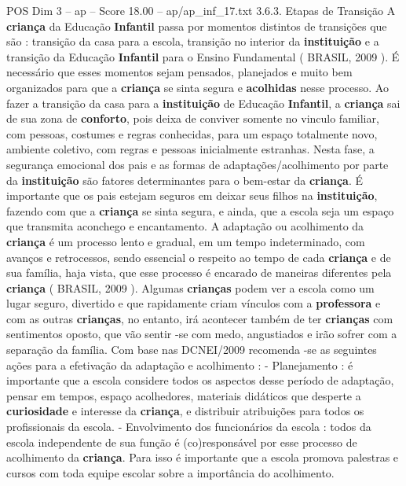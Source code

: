 \begin{textsample}{POS Dim 3 – ap – Score 18.00 – ap/ap\_inf\_17.txt}  \label{ex:f3_pos_186}
3.6.3.
Etapas de Transição A \textbf{criança} da Educação \textbf{Infantil} passa por momentos distintos de transições que são : transição da casa para a escola, transição no interior da \textbf{instituição} e a transição da Educação \textbf{Infantil} para o Ensino Fundamental ( BRASIL, 2009 ).
É necessário que esses momentos sejam pensados, planejados e muito bem organizados para que a \textbf{criança} se sinta segura e \textbf{acolhidas} nesse processo.
Ao fazer a transição da casa para a \textbf{instituição} de Educação \textbf{Infantil}, a \textbf{criança} sai de sua zona de \textbf{conforto}, pois deixa de conviver somente no vinculo familiar, com pessoas, costumes e regras conhecidas, para um espaço totalmente novo, ambiente coletivo, com regras e pessoas inicialmente estranhas.
Nesta fase, a segurança emocional dos pais e as formas de adaptações/acolhimento por parte da \textbf{instituição} são fatores determinantes para o bem-estar da \textbf{criança}.
É importante que os pais estejam seguros em deixar seus filhos na \textbf{instituição}, fazendo com que a \textbf{criança} se sinta segura, e ainda, que a escola seja um espaço que transmita aconchego e encantamento.
A adaptação ou acolhimento da \textbf{criança} é um processo lento e gradual, em um tempo indeterminado, com avanços e retrocessos, sendo essencial o respeito ao tempo de cada \textbf{criança} e de sua família, haja vista, que esse processo é encarado de maneiras diferentes pela \textbf{criança} ( BRASIL, 2009 ).
Algumas \textbf{crianças} podem ver a escola como um lugar seguro, divertido e que rapidamente criam vínculos com a \textbf{professora} e com as outras \textbf{crianças}, no entanto, irá acontecer também de ter \textbf{crianças} com sentimentos oposto, que vão sentir -se com medo, angustiados e irão sofrer com a separação da família.
Com base nas DCNEI/2009 recomenda -se as seguintes ações para a efetivação da adaptação e acolhimento : - Planejamento : é importante que a escola considere todos os aspectos desse período de adaptação, pensar em tempos, espaço acolhedores, materiais didáticos que desperte a \textbf{curiosidade} e interesse da \textbf{criança}, e distribuir atribuições para todos os profissionais da escola. - Envolvimento dos funcionários da escola : todos da escola independente de sua função é (co)responsável por esse processo de acolhimento da \textbf{criança}.
Para isso é importante que a escola promova palestras e cursos com toda equipe escolar sobre a importância do acolhimento.

\end{textsample}
